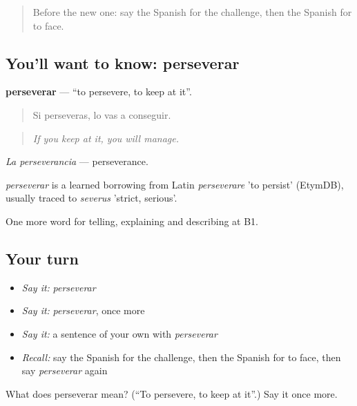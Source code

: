 \label{lesson:ES-C609-perseverar}



\begin{quote}
Before the new one: say the Spanish for the challenge, then the Spanish for to face.
\end{quote}

\subsection*{You'll want to know: perseverar}
\textbf{perseverar} — \textquotedblleft{}to persevere, to keep at it\textquotedblright{}.

\begin{quote}
Si perseveras, lo vas a conseguir.
\end{quote}

\begin{quote}
\emph{If you keep at it, you will manage.}
\end{quote}

\emph{La perseverancia} — perseverance.

\begin{cousinweb}
\emph{perseverar} is a learned borrowing from Latin \emph{perseverare} 'to persist' (EtymDB), usually traced to \emph{severus} 'strict, serious'.
\end{cousinweb}

\begin{grammarlens}[title={What you've built}]
One more word for telling, explaining and describing at B1.
\end{grammarlens}

\subsection*{Your turn}
\begin{itemize}
\raggedright
  \item \emph{Say it:} \emph{perseverar}
  \item \emph{Say it:} \emph{perseverar}, once more
  \item \emph{Say it:} a sentence of your own with \emph{perseverar}
  \item \emph{Recall:} say the Spanish for the challenge, then the Spanish for to face, then say \emph{perseverar} again
\end{itemize}

\begin{tcolorbox}[breakable,colback=teal!4,colframe=teal!35!black,title={Before you move on}]
What does perseverar mean? (\textquotedblleft{}To persevere, to keep at it\textquotedblright{}.) Say it once more.
\end{tcolorbox}
